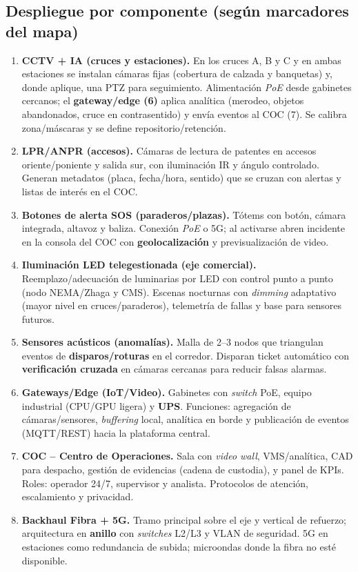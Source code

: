 \documentclass[12pt,a4paper]{article}
\begin{document}
\subsection{Despliegue por componente (según marcadores del mapa)}
\begin{enumerate}
  \item \textbf{CCTV + IA (cruces y estaciones).} En los cruces A, B y C y en ambas estaciones se instalan cámaras fijas (cobertura de calzada y banquetas) y, donde aplique, una PTZ para seguimiento. Alimentación \textit{PoE} desde gabinetes cercanos; el \textbf{gateway/edge (6)} aplica analítica (merodeo, objetos abandonados, cruce en contrasentido) y envía eventos al COC (7). Se calibra zona/máscaras y se define repositorio/retención.
  \item \textbf{LPR/ANPR (accesos).} Cámaras de lectura de patentes en accesos oriente/poniente y salida sur, con iluminación IR y ángulo controlado. Generan metadatos (placa, fecha/hora, sentido) que se cruzan con alertas y listas de interés en el COC.
  \item \textbf{Botones de alerta SOS (paraderos/plazas).} Tótems con botón, cámara integrada, altavoz y baliza. Conexión \textit{PoE} o 5G; al activarse abren incidente en la consola del COC con \textbf{geolocalización} y previsualización de video.
  \item \textbf{Iluminación LED telegestionada (eje comercial).} Reemplazo/adecuación de luminarias por LED con control punto a punto (nodo NEMA/Zhaga y CMS). Escenas nocturnas con \textit{dimming} adaptativo (mayor nivel en cruces/paraderos), telemetría de fallas y base para sensores futuros.
  \item \textbf{Sensores acústicos (anomalías).} Malla de 2--3 nodos que triangulan eventos de \textbf{disparos/roturas} en el corredor. Disparan ticket automático con \textbf{verificación cruzada} en cámaras cercanas para reducir falsas alarmas.
  \item \textbf{Gateways/Edge (IoT/Video).} Gabinetes con \textit{switch} PoE, equipo industrial (CPU/GPU ligera) y \textbf{UPS}. Funciones: agregación de cámaras/sensores, \textit{buffering} local, analítica en borde y publicación de eventos (MQTT/REST) hacia la plataforma central.
  \item \textbf{COC -- Centro de Operaciones.} Sala con \textit{video wall}, VMS/analítica, CAD para despacho, gestión de evidencias (cadena de custodia), y panel de KPIs. Roles: operador 24/7, supervisor y analista. Protocolos de atención, escalamiento y privacidad.
  \item \textbf{Backhaul Fibra + 5G.} Tramo principal sobre el eje y vertical de refuerzo; arquitectura en \textbf{anillo} con \textit{switches} L2/L3 y VLAN de seguridad. 5G en estaciones como redundancia de subida; microondas donde la fibra no esté disponible.
\end{enumerate}
\end{document}
